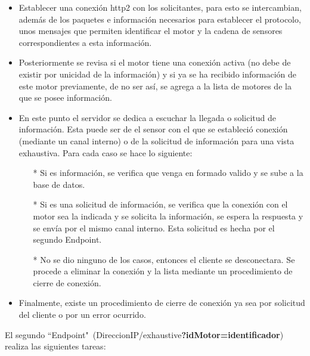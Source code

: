     \begin{itemize}
        \item Establecer una conexión http2 con los solicitantes, para esto se intercambian,
            además de los paquetes e información necesarios para establecer el protocolo,
            unos mensajes que permiten identificar el motor y la cadena de sensores
            correspondientes a esta información.
        \item Posteriormente se revisa si el motor
            tiene una conexión activa (no debe de existir por unicidad de la información)
            y si ya se ha recibido información de este motor previamente, de no ser así,
            se agrega a la lista de motores de la que se posee información.
        \item En este punto el servidor se dedica a escuchar la llegada o solicitud
            de información. Esta puede ser de el sensor con el que se estableció
            conexión (mediante un canal interno) o  de la solicitud de información
            para una vista exhaustiva. Para cada caso se hace lo siguiente:
            \begin{itemize}
                \item[*] Si es información, se verifica que venga en formado valido
                    y se sube a la base de datos.
                \item[*] Si es una solicitud de información, se verifica que
                    la conexión con el motor sea la indicada y se solicita la
                    información, se espera la respuesta y se envía por el mismo
                    canal interno. Esta solicitud es hecha por el segundo Endpoint.
                \item[*] No se dio ninguno de los casos, entonces el cliente se
                    desconectara. Se procede a eliminar la conexión y la lista
                    mediante un procedimiento de cierre de conexión.
            \end{itemize}
        \item Finalmente, existe un procedimiento de cierre de conexión ya sea
            por solicitud del cliente o por un error ocurrido.
    \end{itemize}


    El segundo ``Endpoint"\ (DireccionIP/exhaustive\textbf{?idMotor=identificador})
    realiza las siguientes tareas:

